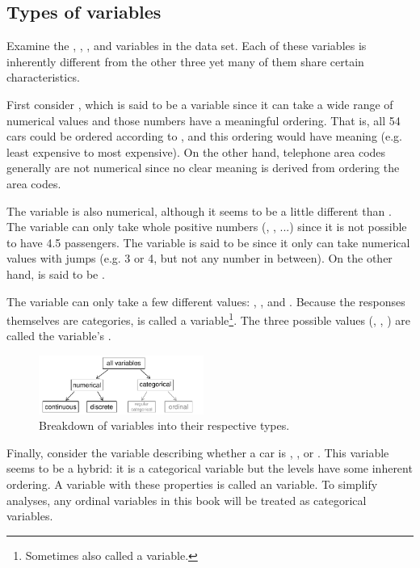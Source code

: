 \subsection{Types of variables}
\label{variableTypes}

Examine the , , , and  variables in the  data set. Each of these variables is inherently different from the other three yet many of them share certain characteristics.

First consider , which is said to be a  variable since it can take a wide range of numerical values and those numbers have a meaningful ordering. That is, all 54 cars could be ordered according to , and this ordering would have meaning (e.g. least expensive to most expensive). On the other hand, telephone area codes generally are not numerical since no clear meaning is derived from ordering the area codes.

The  variable is also numerical, although it seems to be a little different than . The variable  can only take whole positive numbers (, , ...) since it is not possible to have 4.5 passengers. The variable  is said to be  since it only can take numerical values with jumps (e.g. 3 or 4, but not any number in between). On the other hand,  is said to be .

The variable  can only take a few different values: , , and . Because the responses themselves are categories,  is called a  variable\footnote{Sometimes also called a  variable.}. The three possible values (, , ) are called the variable's .

\begin{figure}
\centering
\includegraphics[width=0.48\textwidth]{01/figures/variables/variables}
\caption{Breakdown of variables into their respective types.}
\label{variables}
\end{figure}

Finally, consider the  variable describing whether a car is , , or . This variable seems to be a hybrid: it is a categorical variable but the levels have some inherent ordering. A variable with these properties is called an  variable. To simplify analyses, any ordinal variables in this book will be treated as categorical variables.


